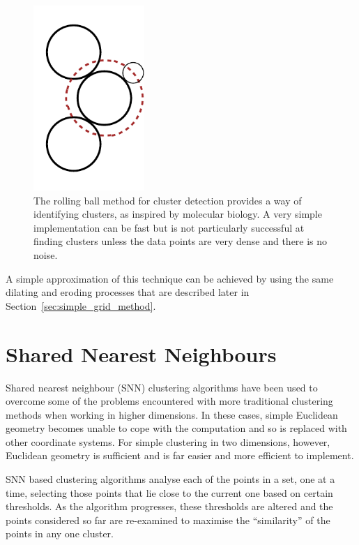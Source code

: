 \begin{figure}[tbh]
	\centering
	\includegraphics[width=4.2cm]{rolling-ball.pdf}

	\caption[Rolling ball method for cluster analysis.]{The rolling ball method
		for cluster detection provides a way of identifying clusters, as
		inspired by molecular biology. A very simple implementation can be fast
		but is not particularly successful at finding clusters unless the data
		points are very dense and there is no noise.}\label{fig:rolling-ball}
\end{figure}

A simple approximation of this technique can be achieved by using the same
dilating and eroding processes that are described later in
Section~\ref{sec:simple_grid_method}.

\section{Shared Nearest Neighbours}
\label{sub:shared_nearest_neighbours}

Shared nearest neighbour (SNN) clustering algorithms have been used to overcome
some of the problems encountered with more traditional clustering methods when
working in higher dimensions. In these cases, simple Euclidean geometry becomes
unable to cope with the computation and so is replaced with other coordinate
systems. For simple clustering in two dimensions, however, Euclidean geometry
is sufficient and is far easier and more efficient to implement.

SNN based clustering algorithms analyse each of the points in a set, one at a
time, selecting those points that lie close to the current one based on certain
thresholds. As the algorithm progresses, these thresholds are altered and the
points considered so far are re-examined to maximise the ``similarity'' of the
points in any one cluster.

